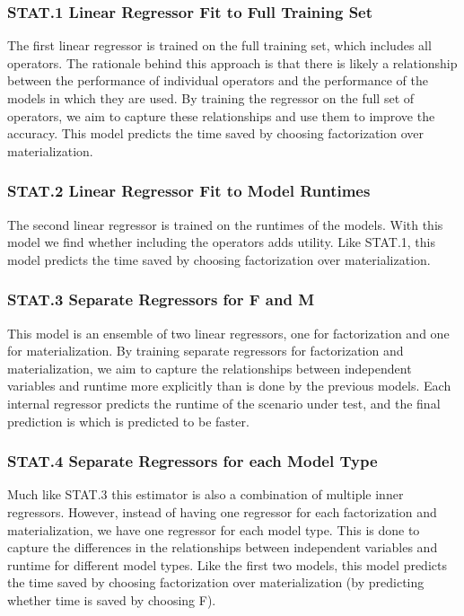 \subsubsection*{STAT.1 Linear Regressor Fit to Full Training Set}
The first linear regressor is trained on the full training set, which includes all operators. The rationale behind this approach is that there is likely a relationship between the performance of individual operators and the performance of the models in which they are used. By training the regressor on the full set of operators, we aim to capture these relationships and use them to improve the accuracy. This model predicts the time saved by choosing factorization over materialization.

\subsubsection*{STAT.2 Linear Regressor Fit to Model Runtimes}
The second linear regressor is trained on the runtimes of the models. With this model we find whether including the operators adds utility. Like STAT.1, this model predicts the time saved by choosing factorization over materialization.

\subsubsection*{STAT.3 Separate Regressors for F and M}
This model is an ensemble of two linear regressors, one for factorization and one for materialization. By training separate regressors for factorization and materialization, we aim to capture the relationships between independent variables and runtime more explicitly than is done by the previous models. Each internal regressor predicts the runtime of the scenario under test, and the final prediction is which is predicted to be faster.

\subsubsection*{STAT.4 Separate Regressors for each Model Type}
Much like STAT.3 this estimator is also a combination of multiple inner regressors. However, instead of having one regressor for each factorization and materialization, we have one regressor for each model type. This is done to capture the differences in the relationships between independent variables and runtime for different model types. Like the first two models, this model predicts the time saved by choosing factorization over materialization (by predicting whether time is saved by choosing F).

